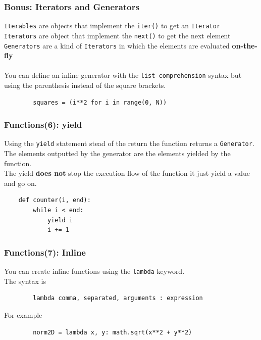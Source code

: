 \documentclass{beamer}
\newcommand{\pyfuncname}[2]{\texttt{\textunderscore\textunderscore#1\textunderscore\textunderscore#2}}
\begin{document}
\begin{frame}[fragile]
    \frametitle{Bonus: Iterators and Generators}
    \texttt{Iterables} are objects that implement the \pyfuncname{iter}{()} to get an \texttt{Iterator}\\
    \texttt{Iterators} are object that implement the \pyfuncname{next}{()} to get the next element\\
    \texttt{Generators} are a kind of \texttt{Iterators} in which the elements are evaluated \textbf{on-the-fly}\\
    \hfill \\
    You can define an inline generator with the \texttt{list comprehension} syntax but using the parenthesis instead of the square brackets.
    \begin{verbatim}
        squares = (i**2 for i in range(0, N))
    \end{verbatim}
\end{frame}



\begin{frame}[fragile]
    \frametitle{Functions(6): yield}
    Using the \texttt{yield} statement stead of the return the function returns a \texttt{Generator}.\\
    The elements outputted by the generator are the elements yielded by the function.\\
    The yield \textbf{does not} stop the execution flow of the function it just yield a value and go on.\\
    \begin{verbatim}
    def counter(i, end):
        while i < end:
            yield i
            i += 1
    \end{verbatim}
\end{frame}

\begin{frame}[fragile]
    \frametitle{Functions(7): Inline}
    You can create inline functions using the \texttt{lambda} keyword.\\
    The syntax is 
    \begin{verbatim}
        lambda comma, separated, arguments : expression
    \end{verbatim}
    For example
    \begin{verbatim}
        norm2D = lambda x, y: math.sqrt(x**2 + y**2)
    \end{verbatim}
\end{frame}
\end{document}
